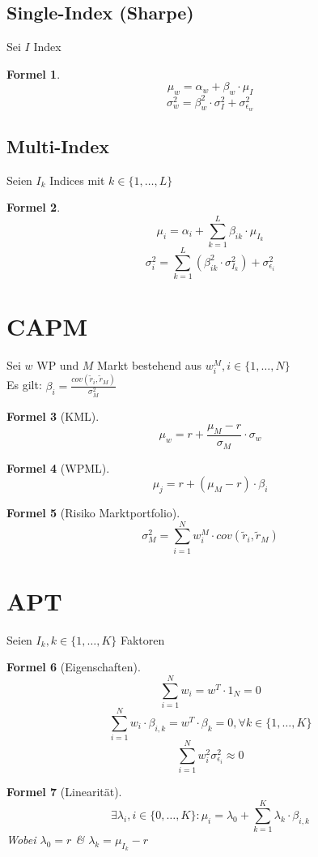 \documentclass[a4paper]{article}
\theoremstyle{break}
\newtheorem{formula}{Formel}[section]
\begin{document}
    \subsection{Single-Index (Sharpe)}
    Sei $I$ Index
    \begin{formula}
        $$\mu_w = \alpha_w + \beta_w \cdot \mu_I$$
        $$\sigma^{2}_w = \beta^{2}_w \cdot \sigma^{2}_I + \sigma^{2}_{\epsilon_w}$$
    \end{formula} 
    \subsection{Multi-Index}
    Seien $I_k$ Indices mit $k \in \{1, \dots, L\}$
    \begin{formula}
       $$\mu_i = \alpha_i + \sum_{k=1}^{L} \beta_{ik} \cdot \mu_{I_k}$$
       $$\sigma^{2}_i = \sum_{k=1}^{L} ( \beta^{2}_{ik} \cdot \sigma^{2}_{I_k} ) + \sigma^{2}_{\epsilon_i}$$
    \end{formula}
    \section{CAPM}
    Sei $w$ WP und $M$ Markt bestehend aus $w^M_i, i \in \{1, \dots, N\}$\\
    Es gilt: $\beta_i = \frac{cov(\tilde{r}_i, \tilde{r}_M)}{\sigma^{2}_M}$
    \begin{formula}[KML]
        $$\mu_w = r + \frac{\mu_M - r}{\sigma_M} \cdot \sigma_w$$
    \end{formula}
    \begin{formula}[WPML]
        $$\mu_j = r + (\mu_M - r) \cdot \beta_i$$
    \end{formula}
    \begin{formula}[Risiko Marktportfolio]
        $$\sigma^{2}_M = \sum_{i=1}^{N}w_i^M \cdot cov(\tilde{r}_i, \tilde{r}_M)$$
    \end{formula}
    \section{APT}
    Seien $I_k, k \in \{1, \dots, K\}$ Faktoren
    \begin{formula}[Eigenschaften]
        $$\sum_{i=1}^{N} w_i = w^T \cdot 1_{N} = 0$$
        $$\sum_{i=1}^{N} w_i \cdot \beta_{i,k} = w^T \cdot \beta_k = 0, \forall k \in \{1, \dots, K\}$$
        $$\sum_{i=1}^{N} w^{2}_i \sigma^{2}_{\epsilon_i} \approx 0$$
    \end{formula}
    \begin{formula}[Linearität]
        $$\exists \lambda_i, i \in \{0, \dots, K\}:  \mu_i = \lambda_0 + \sum_{k=1}^{K}\lambda_k \cdot \beta_{i,k}$$
        Wobei $\lambda_0 = r$ \& $\lambda_k = \mu_{I_k} -r$
    \end{formula}
\end{document}
